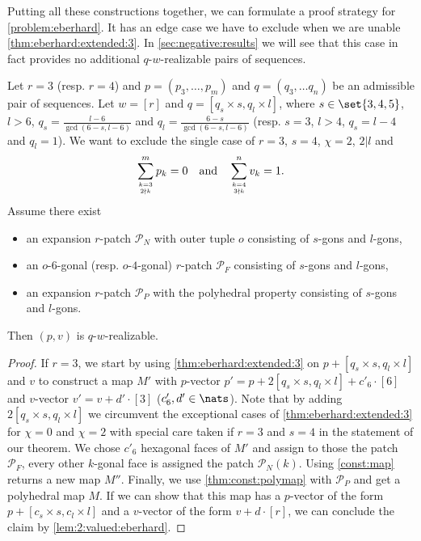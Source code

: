 Putting all these constructions together, we can formulate a proof strategy for \autoref{problem:eberhard}. It has an edge case we have to exclude when we are unable \autoref{thm:eberhard:extended:3}. In \autoref{sec:negative:results} we will see that this case in fact provides no additional $q$-$w$-realizable pairs of sequences.
\begin{proposition}\label{thm:main:const} Let $r = 3$ (resp. $r = 4$) and $p = (p_3, \dots, p_m)$ and $q = (q_3, \dots q_n)$ be an admissible pair of sequences. Let $w = [r]$ and $q = [q_s \times s, q_l \times l]$, where $s \in \set{3, 4, 5}$, $l > 6$, $q_s = \frac{l - 6}{\gcd(6 - s, l - 6)}$ and $q_l = \frac{6 - s}{\gcd(6 - s, l - 6)}$ (resp. $s = 3$, $l > 4$, $q_s = l - 4$ and $q_l = 1$). We want to exclude the single case of $r=3$, $s = 4$, $\chi = 2$, $2 | l$ and
  \begin{align*}
    \sum_{k=3 \atop 2 \nmid k}^{m} p_k = 0 \text{\quad and\quad}\sum_{k=4 \atop 3 \nmid k}^n v_k = 1.
  \end{align*}
Assume there exist
  \begin{itemize}
  \item an expansion $r$-patch $\mathcal{P}_N$ with outer tuple $o$ consisting of $s$-gons and $l$-gons,
  \item an $o$-$6$-gonal (resp. $o$-$4$-gonal) $r$-patch $\mathcal{P}_F$ consisting of $s$-gons and $l$-gons,
  \item an expansion $r$-patch $\mathcal{P}_P$ with the polyhedral property consisting of $s$-gons and $l$-gons.
  \end{itemize}
  Then $(p, v)$ is $q$-$w$-realizable.
  \begin{proof}
    If $r = 3$, we start by using \autoref{thm:eberhard:extended:3} on $p + [q_s \times s, q_l \times l]$ and $v$ to construct a map $M'$ with $p$-vector $p' = p + 2[q_s \times s, q_l \times l] + c'_6 \cdot [6]$ and $v$-vector $v' = v + d' \cdot [3]$ ($c'_6, d' \in \nats$). Note that by adding $2[q_s \times s, q_l \times l]$ we circumvent the exceptional cases of \autoref{thm:eberhard:extended:3} for $\chi = 0$ and $\chi = 2$ with special care taken if $r = 3$ and $s = 4$ in the statement of our theorem. We chose $c'_6$ hexagonal faces of $M'$ and assign to those the patch $\mathcal{P}_F$, every other $k$-gonal face is assigned the patch $\mathcal{P}_N(k)$. Using \autoref{const:map} returns a new map $M''$. Finally, we use \autoref{thm:const:polymap} with $\mathcal{P}_P$ and get a polyhedral map $M$. If we can show that this map has a $p$-vector of the form $p +  [c_s \times s, c_l \times l]$ and a $v$-vector of the form $v + d \cdot [r]$, we can conclude the claim by \autoref{lem:2:valued:eberhard}. 


\end{proof}
\end{proposition}
